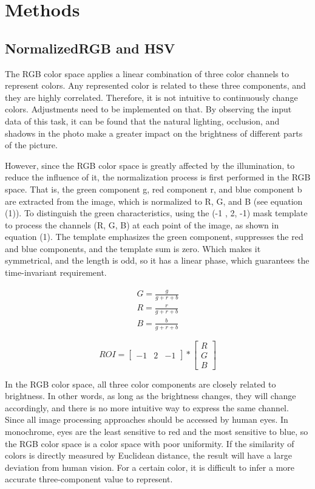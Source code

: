 \documentclass[conference]{IEEEtran}
\begin{document}
\section{Methods}

\subsection{NormalizedRGB and HSV}
The RGB color space applies a linear combination of three color channels to represent colors. Any represented color is related to these three components, and they are highly correlated. Therefore, it is not intuitive to continuously change colors. Adjustments need to be implemented on that. 
By observing the input data of this task, it can be found that the natural lighting, occlusion, and shadows in the photo make a greater impact on the brightness of different parts of the picture.

However, since the RGB color space is greatly affected by the illumination, to reduce the influence of it, the normalization process is first performed in the RGB space. That is, the green component g, red component r, and blue component b are extracted from the image, which is normalized to R, G, and B (see equation (1)). To distinguish the green characteristics, using the (-1 , 2, -1) mask template to process the channels (R, G, B) at each point of the image, as shown in equation (1). The template emphasizes the green component, suppresses the red and blue components, and the template sum is zero. Which makes it symmetrical, and the length is odd, so it has a linear phase, which guarantees the time-invariant requirement. 

\begin{equation}
\begin{aligned}
G= {\frac{g}{g+r+b}}\\ R={\frac{r}{g+r+b}}\\ B={\frac{b}{g+r+b}}
\end{aligned}
\end{equation}

$$
ROI=\begin{bmatrix} -1 & 2 & -1  \end{bmatrix} * \begin{bmatrix} R \\ G \\ B  \end{bmatrix}
$$

In the RGB color space, all three color components are closely related to brightness. In other words, as long as the brightness changes, they will change accordingly, and there is no more intuitive way to express the same channel. Since all image processing approaches should be accessed by human eyes. In monochrome, eyes are the least sensitive to red and the most sensitive to blue, so the RGB color space is a color space with poor uniformity. If the similarity of colors is directly measured by Euclidean distance, the result will have a large deviation from human vision. For a certain color, it is difficult to infer a more accurate three-component value to represent.
\end{document}
